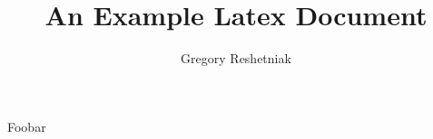 \documentclass{article}
\begin{document}
\title{An Example Latex Document}
\author{Gregory Reshetniak}

Foobar
\end{document}
